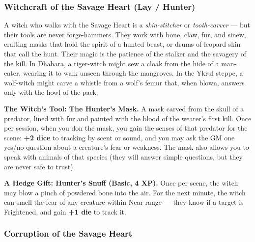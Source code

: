 \subsubsection*{Witchcraft of the Savage Heart (Lay / Hunter)}

A witch who walks with the Savage Heart is a \textit{skin-stitcher} or \textit{tooth-carver} --- but their tools are never forge-hammers. They work with bone, claw, fur, and sinew, crafting masks that hold the spirit of a hunted beast, or drums of leopard skin that call the hunt. Their magic is the patience of the stalker and the savagery of the kill. In Dhahara, a tiger-witch might sew a cloak from the hide of a man-eater, wearing it to walk unseen through the mangroves. In the Ykrul steppe, a wolf-witch might carve a whistle from a wolf's femur that, when blown, answers only with the howl of the pack.

\textbf{The Witch's Tool: The Hunter's Mask.} A mask carved from the skull of a predator, lined with fur and painted with the blood of the wearer's first kill. Once per session, when you don the mask, you gain the senses of that predator for the scene: \textbf{+2 dice} to tracking by scent or sound, and you may ask the GM one yes/no question about a creature's fear or weakness. The mask also allows you to speak with animals of that species (they will answer simple questions, but they are never safe to trust).

\textbf{A Hedge Gift: Hunter's Snuff (Basic, 4 XP).} Once per scene, the witch may blow a pinch of powdered bone into the air. For the next minute, the witch can smell the fear of any creature within Near range --- they know if a target is Frightened, and gain \textbf{+1 die} to track it.

\subsubsection*{Corruption of the Savage Heart}

